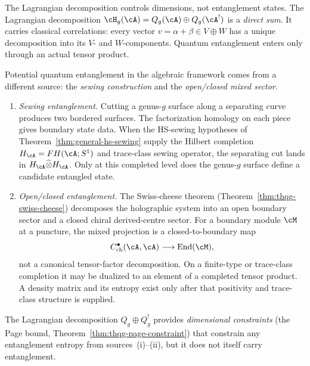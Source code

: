 \begin{remark}
\label{rem:thqg-two-entanglements}
The Lagrangian decomposition controls dimensions, not entanglement
states.
The Lagrangian decomposition
$\cH_g(\cA) = Q_g(\cA) \oplus Q_g(\cA^!)$
is a \emph{direct sum}.  It carries classical correlations:
every vector $v = \alpha+\beta \in V\oplus W$ has a unique
decomposition into its $V$- and $W$-components.  Quantum
entanglement enters only through an actual tensor product.

Potential quantum entanglement in the algebraic framework
comes from a different source: the \emph{sewing construction}
and the \emph{open/closed mixed sector}.
\begin{enumerate}[label=\textup{(\roman*)}]
\item \emph{Sewing entanglement.}
 Cutting a genus-$g$ surface along a separating curve
 produces two bordered surfaces. The factorization homology
 on each piece gives boundary state data.  When the HS-sewing
 hypotheses of Theorem~\ref{thm:general-hs-sewing} supply the
 Hilbert completion $H_\cA=FH(\cA;S^1)$ and trace-class sewing
 operator, the separating cut lands in
 $H_\cA\widehat{\otimes}H_\cA$.  Only at this completed level
 does the genus-$g$ surface define a candidate entangled state.

\item \emph{Open/closed entanglement.}
 The Swiss-cheese theorem
 (Theorem~\ref{thm:thqg-swiss-cheese}) decomposes the
 holographic system into an open boundary sector and a closed
 chiral derived-centre sector.  For a boundary module $\cM$ at
 a puncture, the mixed projection is a closed-to-boundary map
 \[
 C^\bullet_{\mathrm{ch}}(\cA,\cA)\longrightarrow
 \operatorname{End}(\cM),
 \]
 not a canonical tensor-factor decomposition.  On a finite-type
 or trace-class completion it may be dualized to an element of a
 completed tensor product.  A density matrix and its entropy exist
 only after that positivity and trace-class structure is supplied.
\end{enumerate}
The Lagrangian decomposition $Q_g \oplus Q_g^!$ provides
\emph{dimensional constraints} (the Page bound,
Theorem~\ref{thm:thqg-page-constraint}) that constrain
any entanglement entropy from sources~(i)--(ii),
but it does not itself carry entanglement.
\end{remark}

%
%

